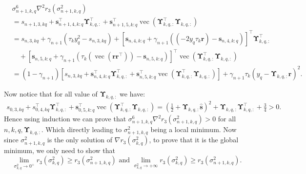 \documentclass{article}
\DeclareMathOperator*{\vect}{vec} %
\def\vr{{\bm{r}}}
\def\vs{{\bm{s}}}
\def\mUpsilon{{\bm{\Upsilon}}}
\begin{document}
\begin{align*} 
    &\sigma_{n+1,k,q}^{6}\nabla^2 r_3(\sigma_{n+1,k,q}^{2})\\
    &=s_{n+1,3,kq}+\vs_{n+1,4,k:q}^{\top}\mUpsilon_{k,q,:}^{\top}+\vs_{n+1,5,k:q}^{\top}\vect(\mUpsilon_{k,q,:}^{\top}\mUpsilon_{k,q,:})\\
    &=s_{n,3,kq}+\gamma_{n+1}\left({\tau}_k y_q^{2}-s_{n,3,kq}\right)+\left[\vs_{n,4,k:q}+\gamma_{n+1}\left((-2y_q\tau_k\vr)-\vs_{n,4,k:q}\right)\right]^{\top}\mUpsilon_{k,q,:}^{\top}\\
    &\quad +\left[\vs_{n,5,k:q}+\gamma_{n+1}\left(\tau_k\left(\vect\left(\vr\vr^{\top}\right)\right)-\vs_{n,5,k:q}\right)\right]^{\top}\vect(\mUpsilon_{k,q,:}^{\top}\mUpsilon_{k,q,:})\\
    &=(1-\gamma_{n+1})\left[s_{n,3,kq}+\vs_{n,4,k:q}^{\top}\mUpsilon_{k,q,:}^{\top}+\vs_{n,5,k:q}^{\top}\vect(\mUpsilon_{k,q,:}^{\top}\mUpsilon_{k,q,:})\right]+\gamma_{n+1}\tau_k\left(y_q-\mUpsilon_{k,q,:}\vr\right)^2.
\end{align*}
\par Now notice that for all value of $\mUpsilon_{k,q,:}$ we have:
\begin{align*}
    s_{0,3,kq}+s_{0,4,kq}^{\top}\mUpsilon_{k,q,:}^{\top}+\vs_{0,5,k:q}^{\top}\vect(\mUpsilon_{k,q,:}^{\top}\mUpsilon_{k,q,:})=\left(\frac{1}{2}+\mUpsilon_{k,q,:}\widehat{\vs}\right)^2 +\mUpsilon_{k,q,:}\mUpsilon_{k,q,:}^{\top}+\frac{3}{4} >0.
\end{align*}
Hence using induction we can prove that $\sigma_{n+1,k,q}^{6}\nabla^2 r_3(\sigma_{n+1,k,q}^{2})>0$ for all $n, k,q, \mUpsilon_{k,q,:}$. Which directly leading to $\sigma_{n+1,k,q}^{2}$ being a local minimum. Now since $\sigma_{n+1,k,q}^{2}$ is the only solution of $\nabla r_3(\sigma_{k,q}^2)$, to prove that it is the global minimum, we only need to show that $$\displaystyle\lim_{\sigma_{k,q}^2\rightarrow0^{+}}r_3(\sigma_{k,q}^2)\geq r_3(\sigma_{n+1,k,q}^{2}) \text{ and } \displaystyle\lim_{\sigma_{k,q}^2\rightarrow+\infty}r_3(\sigma_{k,q}^2)\geq r_3(\sigma_{n+1,k,q}^{2}).$$ 
\end{document}
